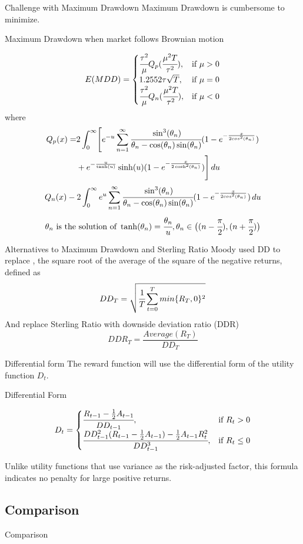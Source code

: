 \begin{frame}{Challenge with Maximum Drawdown}
Maximum Drawdown is cumbersome to minimize.
\begin{block}{Maximum Drawdown when market follows Brownian motion}

\[E(MDD)=
\begin{cases}
    \cfrac{\tau^2}{\mu}Q_p(\cfrac{\mu^2T}{\tau^2}),&\text{if  }\mu > 0\\
    1.2552 \tau \sqrt{T},& \text{if  }\mu=0 \\
    \cfrac{\tau^2}{\mu}Q_n(\cfrac{\mu^2T}{\tau^2}),&\text{if  }\mu <0
\end{cases}
\]
where
\[
\begin{aligned}
Q_p(x) = &2\int_0^\infty\Biggl[
    e^{-u}\sum_{n=1}^{\infty}
    \cfrac{\sin^3(\theta_n)}{\theta_n-\cos(\theta_n)\sin(\theta_n)}
    (1-e^{-\frac{x}{2cos^2(\theta_n)}})\\
    &+e^{-\frac{u}{\tanh(u)}}\sinh(u)
    (1-e^{-\frac{x}{2\cosh^2(\theta_n)}})
    \Biggr]\,du
\end{aligned}
\]
\[
Q_n(x)-2\int_0^\infty e^u \sum_{n=1}^{\infty}
\cfrac{\sin^3(\theta_n)}{\theta_n-\cos(\theta_n)\sin(\theta_n)}
(1-e^{-\frac{x}{2cos^2(\theta_n)}})
\,du
\]
\[
\theta_n \text{ is the solution of }
 \tanh(\theta_n) =\cfrac{\theta_n}{u},
 \theta_n \in \bigl( (n-\cfrac{\pi}{2}),(n+\cfrac{\pi}{2})\bigr)
\]
\end{block}
    
\end{frame}
\begin{frame}{Alternatives to Maximum Drawdown and  Sterling Ratio}
Moody used DD to replace , the square root of the average of the
square of the negative returns, defined as
\[
DD_T = \sqrt{\cfrac{1}{T}\sum_{t=0}^{T}{min\{R_T,0\}^2}}
\]
And replace Sterling Ratio with downside deviation ratio (DDR)
\[
DDR_T = \frac{Average(R_T)}{DD_T}
\]
\end{frame}


\begin{frame}{Differential form}
The reward function will use the differential form of the utility function \(D_t\).

\begin{block}{Differential Form}

\[
D_t = 
\begin{cases}
    \cfrac{R_{t-1} -\frac{1}{2}A_{t-1}}{DD_{t-1}},&\text{if  }R_t > 0\\
    \cfrac{DD_{t-1}^2 (R_{t-1}-\frac{1}{2}A_{t-1})  -\frac{1}{2}A_{t-1} R_t^2}{DD_{t-1}^3},&\text{if  }R_t \leq 0
\end{cases}
\]
\end{block}
Unlike utility functions that use variance as the risk-adjusted factor, this formula indicates no penalty for large positive returns. 

\end{frame}


\subsection{Comparison}
\begin{frame}{Comparison}
    
\end{frame}
